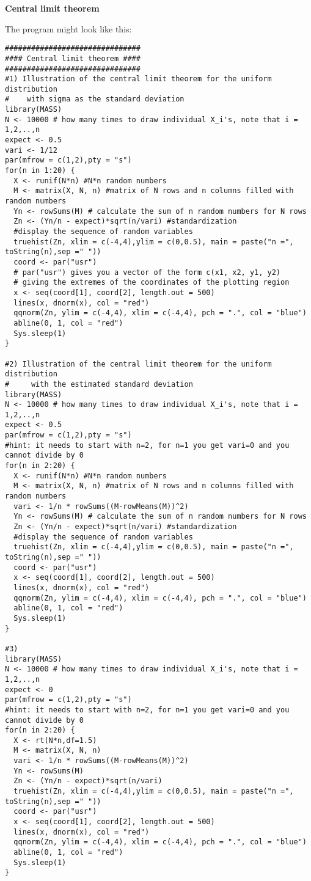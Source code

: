 \documentclass{article}
\begin{document}
\begin{solution}
\textbf{Central limit theorem}

The program might look like this:
\begin{verbatim}
###############################
#### Central limit theorem ####
###############################
#1) Illustration of the central limit theorem for the uniform distribution
#    with sigma as the standard deviation
library(MASS)
N <- 10000 # how many times to draw individual X_i's, note that i = 1,2,..,n
expect <- 0.5
vari <- 1/12
par(mfrow = c(1,2),pty = "s")
for(n in 1:20) {
  X <- runif(N*n) #N*n random numbers
  M <- matrix(X, N, n) #matrix of N rows and n columns filled with random numbers
  Yn <- rowSums(M) # calculate the sum of n random numbers for N rows
  Zn <- (Yn/n - expect)*sqrt(n/vari) #standardization
  #display the sequence of random variables
  truehist(Zn, xlim = c(-4,4),ylim = c(0,0.5), main = paste("n =", toString(n),sep =" "))
  coord <- par("usr")
  # par("usr") gives you a vector of the form c(x1, x2, y1, y2)
  # giving the extremes of the coordinates of the plotting region
  x <- seq(coord[1], coord[2], length.out = 500)
  lines(x, dnorm(x), col = "red")
  qqnorm(Zn, ylim = c(-4,4), xlim = c(-4,4), pch = ".", col = "blue")
  abline(0, 1, col = "red")
  Sys.sleep(1)
}

#2) Illustration of the central limit theorem for the uniform distribution
#     with the estimated standard deviation
library(MASS)
N <- 10000 # how many times to draw individual X_i's, note that i = 1,2,..,n
expect <- 0.5
par(mfrow = c(1,2),pty = "s")
#hint: it needs to start with n=2, for n=1 you get vari=0 and you cannot divide by 0
for(n in 2:20) {
  X <- runif(N*n) #N*n random numbers
  M <- matrix(X, N, n) #matrix of N rows and n columns filled with random numbers
  vari <- 1/n * rowSums((M-rowMeans(M))^2)
  Yn <- rowSums(M) # calculate the sum of n random numbers for N rows
  Zn <- (Yn/n - expect)*sqrt(n/vari) #standardization
  #display the sequence of random variables
  truehist(Zn, xlim = c(-4,4),ylim = c(0,0.5), main = paste("n =", toString(n),sep =" "))
  coord <- par("usr")
  x <- seq(coord[1], coord[2], length.out = 500)
  lines(x, dnorm(x), col = "red")
  qqnorm(Zn, ylim = c(-4,4), xlim = c(-4,4), pch = ".", col = "blue")
  abline(0, 1, col = "red")
  Sys.sleep(1)
}

#3)
library(MASS)
N <- 10000 # how many times to draw individual X_i's, note that i = 1,2,..,n
expect <- 0
par(mfrow = c(1,2),pty = "s")
#hint: it needs to start with n=2, for n=1 you get vari=0 and you cannot divide by 0
for(n in 2:20) {
  X <- rt(N*n,df=1.5)
  M <- matrix(X, N, n)
  vari <- 1/n * rowSums((M-rowMeans(M))^2)
  Yn <- rowSums(M)
  Zn <- (Yn/n - expect)*sqrt(n/vari)
  truehist(Zn, xlim = c(-4,4),ylim = c(0,0.5), main = paste("n =", toString(n),sep =" "))
  coord <- par("usr")
  x <- seq(coord[1], coord[2], length.out = 500)
  lines(x, dnorm(x), col = "red")
  qqnorm(Zn, ylim = c(-4,4), xlim = c(-4,4), pch = ".", col = "blue")
  abline(0, 1, col = "red")
  Sys.sleep(1)
}
\end{verbatim}
\end{solution}
\end{document}
